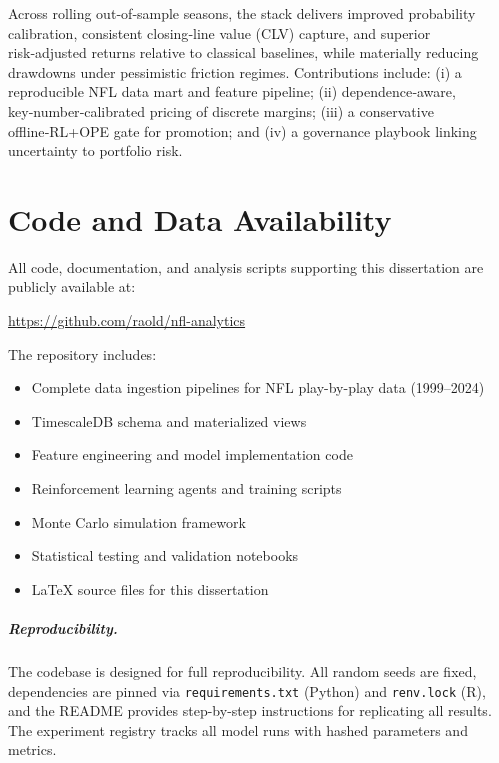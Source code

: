 \documentclass[12pt]{report}  %
\numberwithin{equation}{section}
\theoremstyle{plain}
\theoremstyle{definition}
\theoremstyle{remark}
\begin{document}
Across rolling out‑of‑sample seasons, the stack delivers improved probability calibration, consistent closing‑line value (CLV) capture, and superior risk‑adjusted returns relative to classical baselines, while materially reducing drawdowns under pessimistic friction regimes. Contributions include: (i) a reproducible NFL data mart and feature pipeline; (ii) dependence‑aware, key‑number‑calibrated pricing of discrete margins; (iii) a conservative offline‑RL+OPE gate for promotion; and (iv) a governance playbook linking uncertainty to portfolio risk.\par
{}

\chapter*{Code and Data Availability}

All code, documentation, and analysis scripts supporting this dissertation are publicly available at:

\begin{center}
\url{https://github.com/raold/nfl-analytics}
\end{center}

The repository includes:
\begin{itemize}
  \item Complete data ingestion pipelines for NFL play-by-play data (1999--2024)
  \item TimescaleDB schema and materialized views
  \item Feature engineering and model implementation code
  \item Reinforcement learning agents and training scripts
  \item Monte Carlo simulation framework
  \item Statistical testing and validation notebooks
  \item LaTeX source files for this dissertation
\end{itemize}

\paragraph{Reproducibility.}
The codebase is designed for full reproducibility. All random seeds are fixed, dependencies are pinned via \texttt{requirements.txt} (Python) and \texttt{renv.lock} (R), and the README provides step-by-step instructions for replicating all results. The experiment registry tracks all model runs with hashed parameters and metrics.
\end{document}
